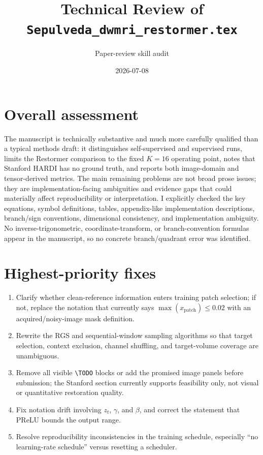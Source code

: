 \documentclass[11pt]{article}
\title{Technical Review of \texttt{Sepulveda\_dwmri\_restormer.tex}}
\author{Paper-review skill audit}
\date{2026-07-08}
\begin{document}
\maketitle

\section*{Overall assessment}

The manuscript is technically substantive and much more carefully qualified than a typical methods draft: it distinguishes self-supervised and supervised runs, limits the Restormer comparison to the fixed $K=16$ operating point, notes that Stanford HARDI has no ground truth, and reports both image-domain and tensor-derived metrics. The main remaining problems are not broad prose issues; they are implementation-facing ambiguities and evidence gaps that could materially affect reproducibility or interpretation. I explicitly checked the key equations, symbol definitions, tables, appendix-like implementation descriptions, branch/sign conventions, dimensional consistency, and implementation ambiguity. No inverse-trigonometric, coordinate-transform, or branch-convention formulas appear in the manuscript, so no concrete branch/quadrant error was identified.

\section*{Highest-priority fixes}

\begin{enumerate}
  \item Clarify whether clean-reference information enters training patch selection; if not, replace the notation that currently says $\max(x_{\mathrm{patch}})\leq0.02$ with an acquired/noisy-image mask definition.
  \item Rewrite the RGS and sequential-window sampling algorithms so that target selection, context exclusion, channel shuffling, and target-volume coverage are unambiguous.
  \item Remove all visible \texttt{\textbackslash TODO} blocks or add the promised image panels before submission; the Stanford section currently supports feasibility only, not visual or quantitative restoration quality.
  \item Fix notation drift involving $z_t$, $\gamma$, and $\beta$, and correct the statement that PReLU bounds the output range.
  \item Resolve reproducibility inconsistencies in the training schedule, especially ``no learning-rate schedule'' versus resetting a scheduler.
\end{enumerate}
\end{document}

